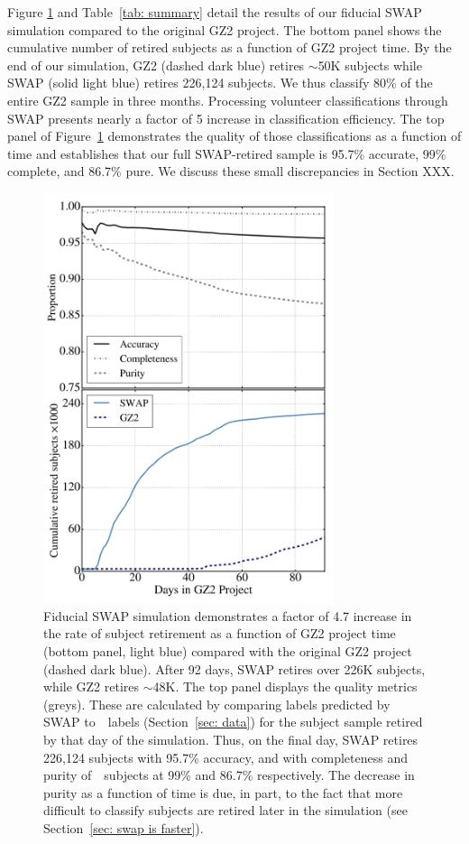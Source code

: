 Figure \ref{fig: fiducial run} and Table~\ref{tab: summary} detail the results of our fiducial SWAP simulation compared to the original GZ2 project. The bottom panel shows the cumulative number of retired subjects as a function of GZ2 project time. By the end of our simulation, GZ2 (dashed dark blue) retires $\sim$50K subjects while SWAP (solid light blue) retires 226,124 subjects. We thus classify 80\% of the entire GZ2 sample in three months. Processing volunteer classifications through SWAP presents nearly a factor of 5 increase in classification efficiency. The top panel of Figure~\ref{fig: fiducial run} demonstrates the quality of those classifications as a function of time and establishes that our full SWAP-retired sample is 95.7\% accurate, 99\% complete, and 86.7\% pure. We discuss these small discrepancies in Section XXX.

\begin{figure}
\includegraphics[width=3.35in]{Figures/human_machine/f3.pdf}
\caption[Reprocessing GZ2 data with SWAP results in a factor of increase in the classification rate.]{Fiducial SWAP simulation demonstrates a factor of 4.7 increase in the rate of subject retirement as a function of GZ2 project time (bottom panel, light blue) compared with the original GZ2 project (dashed dark blue). After 92 days, SWAP retires over 226K subjects, while GZ2 retires $\sim$48K.  The top panel displays the quality metrics (greys). These are calculated by comparing labels predicted by SWAP to~\raw~labels (Section~\ref{sec: data}) for the subject sample retired by that day of the simulation. Thus, on the final day, SWAP retires 226,124 subjects with 95.7\% accuracy,  and with completeness and purity of~\feat~subjects at 99\% and 86.7\% respectively. The decrease in purity as a function of time is due, in part, to the fact that more difficult to classify subjects are retired later in the simulation (see Section~\ref{sec: swap is faster}).}
\label{fig: fiducial run}
\end{figure}


